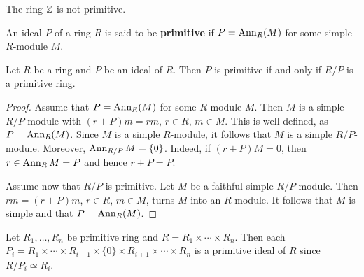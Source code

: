\begin{example}
	The ring $\mathbb{Z}$ is not primitive. 
\end{example}

An ideal $P$ of a ring $R$ is said to be \textbf{primitive} if $P=\operatorname{Ann}_R(M)$
for some simple $R$-module $M$. 

\begin{lemma}
	\label{lemma:primitivo}
	Let $R$ be a ring and $P$ be an ideal of $R$. Then $P$ is primitive if and only if 
	$R/P$ is a primitive ring.
\end{lemma}

\begin{proof}
	Assume that $P=\operatorname{Ann}_R(M)$ for some $R$-module $M$. Then $M$ is a simple 
	$R/P$-module with $(r+P)m=rm$, $r\in R$, $m\in M$. This is well-defined, as 
	$P=\operatorname{Ann}_R(M)$. Since $M$ is a simple $R$-module, it follows that $M$ is 
	a simple $R/P$-module. Moreover, $\operatorname{Ann}_{R/P}M=\{0\}$. Indeed, if 
	$(r+P)M=0$, then $r\in\operatorname{Ann}_RM=P$ and hence $r+P=P$.

	Assume now that $R/P$ is primitive. Let $M$ be a faithful simple $R/P$-module. 
	Then $rm=(r+P)m$, $r\in R$,
	$m\in M$, turns $M$ into an $R$-module. It follows that $M$ is simple and that $P=\operatorname{Ann}_R(M)$. 
\end{proof}



\begin{example}
	Let $R_1,\dots,R_n$ be primitive ring and $R=R_1\times\cdots\times
	R_n$. Then each $P_i=R_1\times\cdots\times R_{i-1}\times\{0\}\times
	R_{i+1}\times\cdots\times R_n$ is a primitive ideal of $R$ since 
	$R/P_i\simeq R_i$.
\end{example}

%

